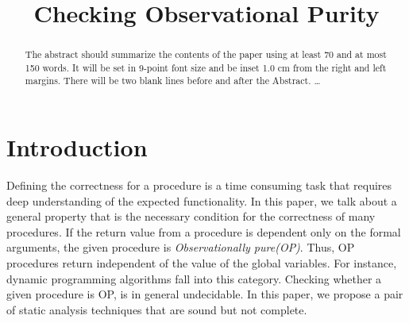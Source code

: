 \documentclass{llncs}
\begin{document}
\mainmatter              %
%
\title{Checking Observational Purity}
%
%

\maketitle              %

\begin{abstract}
The abstract should summarize the contents of the paper
using at least 70 and at most 150 words. It will be set in 9-point
font size and be inset 1.0 cm from the right and left margins.
There will be two blank lines before and after the Abstract. \dots
{}
\end{abstract}

\section{Introduction}
Defining the correctness for a procedure is a time consuming task that
requires deep understanding of the expected functionality. In this
paper, we talk about a general property that is the necessary
condition for the correctness of many procedures. If the return value
from a procedure is dependent only on the formal arguments, the given
procedure is \textit{Observationally pure(OP)}. Thus, OP procedures
return independent of the value of the global variables. For instance,
dynamic programming algorithms fall into this category. Checking
whether a given procedure is OP, is in general undecidable. In this
paper, we propose a pair of static analysis techniques that are sound
but not complete.
\end{document}

